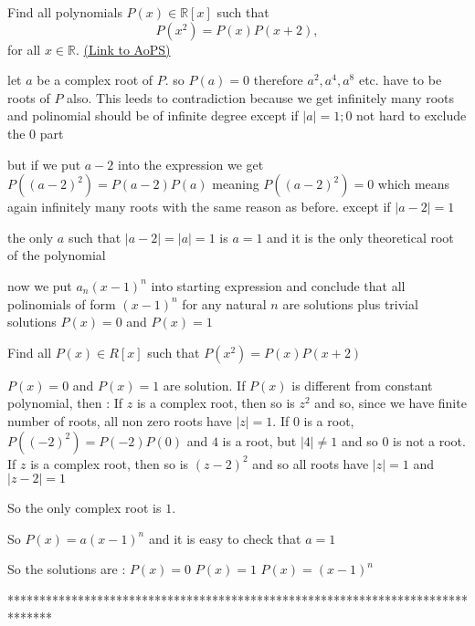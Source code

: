 \begin{problem}
	Find all polynomials $ P(x)\in \mathbb R[x]$ such that 
$$ P(x^2)=P(x)P(x+2),$$
for all $x\in \mathbb R$.
	\flushright \href{https://artofproblemsolving.com/community/c6h184257}{(Link to AoPS)}
\end{problem}



\begin{solution}
	let $ a$ be a complex root of $ P$. so $ P(a)=0$
therefore $ a^2,a^4,a^8$ etc. have to be roots of $ P$ also. This leeds to contradiction because we get infinitely many roots and polinomial should be of infinite degree except if $ |a|=1;0$ not hard to exclude the $ 0$ part

but if we put $ a-2$ into the expression we get $ P((a-2)^2)=P(a-2)P(a)$ meaning $ P((a-2)^2)=0$ which means again infinitely many roots with the same reason as before. except if $ |a-2|=1$

the only $ a$ such that $ |a-2|=|a|=1$ is $ a=1$ and it is the only theoretical root of the polynomial

now we put $ a_n(x-1)^n$ into starting expression and conclude that all polinomials of form $ (x-1)^n$ for any natural $ n$ are solutions plus trivial solutions $ P(x)=0$ and $ P(x)=1$
\end{solution}



\begin{solution}
	\begin{tcolorbox}Find all $ P(x)\in R[x]$ such that 
$ P(x^2) = P(x)P(x + 2)$\end{tcolorbox}

$ P(x)=0$ and $ P(x)=1$ are solution.
If $ P(x)$ is different from constant polynomial, then :
If $ z$ is a complex root, then so is $ z^2$ and so, since we have finite number of roots, all non zero roots have $ |z|=1$.
If $ 0$ is a root, $ P((-2)^2)=P(-2)P(0)$ and $ 4$ is a root, but $ |4|\neq 1$ and so $ 0$ is not a root.
If $ z$ is a complex root, then so is $ (z-2)^2$ and so all roots have $ |z|=1$ and $ |z-2|=1$

So the only complex root is $ 1$.

So $ P(x)=a(x-1)^n$ and it is easy to check that $ a=1$

So the solutions are :
$ P(x)=0$
$ P(x)=1$
$ P(x)=(x-1)^n$
\end{solution}
*******************************************************************************
